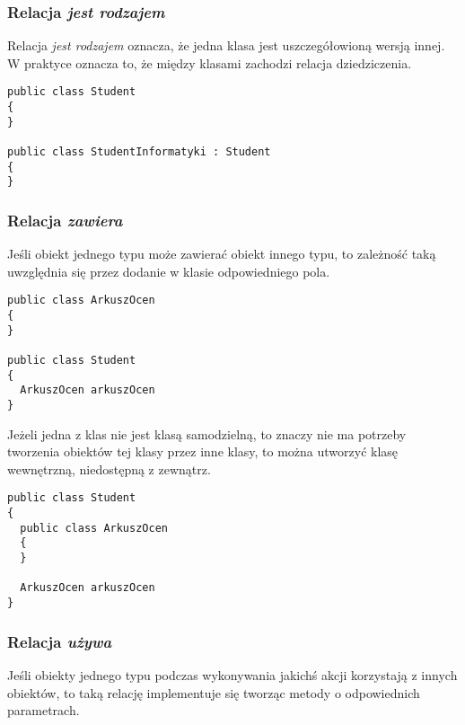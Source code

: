 \subsubsection{Relacja {\em jest rodzajem}}

Relacja {\em jest rodzajem} oznacza, że jedna klasa jest uszczegółowioną wersją innej. W praktyce oznacza to, że
między klasami zachodzi relacja dziedziczenia.

\begin{scriptsize}
\begin{verbatim}
public class Student
{
}

public class StudentInformatyki : Student
{
}
\end{verbatim}
\end{scriptsize}

\subsubsection{Relacja {\em zawiera}}

Jeśli obiekt jednego typu może zawierać obiekt innego typu, to zależność taką uwzględnia się
przez dodanie w klasie odpowiedniego pola.

\begin{scriptsize}
\begin{verbatim}
public class ArkuszOcen
{
}

public class Student
{
  ArkuszOcen arkuszOcen
}
\end{verbatim}
\end{scriptsize}

Jeżeli jedna z klas nie jest klasą samodzielną, to znaczy nie ma potrzeby tworzenia
obiektów tej klasy przez inne klasy, to można utworzyć klasę wewnętrzną, niedostępną z zewnątrz.

\begin{scriptsize}
\begin{verbatim}
public class Student
{
  public class ArkuszOcen
  {
  }

  ArkuszOcen arkuszOcen
}
\end{verbatim}
\end{scriptsize}

\subsubsection{Relacja {\em używa}}

Jeśli obiekty jednego typu podczas wykonywania jakichś akcji korzystają z innych obiektów, to 
taką relację implementuje się tworząc metody o odpowiednich parametrach.

